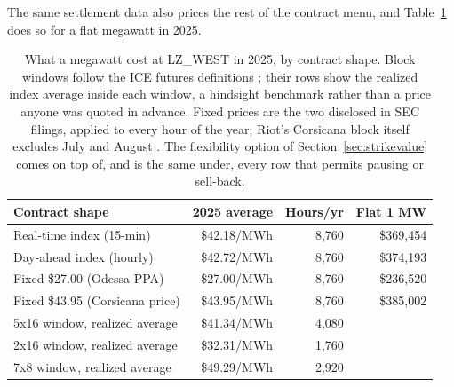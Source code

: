 The same settlement data also prices the rest of the contract menu, and Table~\ref{tab:contract-pnl} does so for a flat megawatt in 2025.

\begin{table}[h]
  \centering
  \footnotesize
  \setlength{\tabcolsep}{4pt}
  \begin{tabular}{lrrr}
    \hline
    \textbf{Contract shape} & \textbf{2025 average} & \textbf{Hours/yr} & \textbf{Flat 1 MW} \\
    \hline
    Real-time index (15-min) & \$42.18/MWh & 8,760 & \$369,454 \\
    Day-ahead index (hourly) & \$42.72/MWh & 8,760 & \$374,193 \\
    Fixed \$27.00 (Odessa PPA) & \$27.00/MWh & 8,760 & \$236,520 \\
    Fixed \$43.95 (Corsicana price) & \$43.95/MWh & 8,760 & \$385,002 \\
    \hline
    5x16 window, realized average & \$41.34/MWh & 4,080 & \\
    2x16 window, realized average & \$32.31/MWh & 1,760 & \\
    7x8 window, realized average & \$49.29/MWh & 2,920 & \\
    \hline
  \end{tabular}
  \caption{What a megawatt cost at LZ\_WEST in 2025, by contract shape. Block windows follow the ICE futures definitions \autocite{ice2026ercotnorthpeak,ice2026ercotnorth7x8}; their rows show the realized index average inside each window, a hindsight benchmark rather than a price anyone was quoted in advance. Fixed prices are the two disclosed in SEC filings, applied to every hour of the year; Riot's Corsicana block itself excludes July and August \autocite{cipher10k2024,riot10k2024}. The flexibility option of Section~\ref{sec:strikevalue} comes on top of, and is the same under, every row that permits pausing or sell-back.} %
  \label{tab:contract-pnl}
\end{table}


